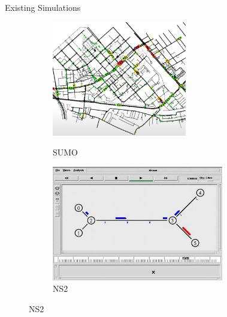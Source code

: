     \begin{frame}{Existing Simulations}
        \begin{figure}
            \centering
            \begin{figure}[ht]
                \begin{minipage}[b]{0.45\linewidth}
                    \centering
                    \includegraphics[width=\textwidth, height=5cm]{Images/sumo_ex_cropped.png}
                    \caption{SUMO \cite{SUMO2022}}
                    \label{fig:a}
                \end{minipage}
                \hspace{0.5cm}
                \begin{minipage}[b]{0.45\linewidth}
                    \centering
                    \includegraphics[width=\textwidth, height=5cm]{Images/NS2-simulator.jpg}
                    \caption{NS2 \cite{absingh}}
                    \label{fig:b}
                \end{minipage}
            \end{figure}
        \end{figure}
    \end{frame}
    

   